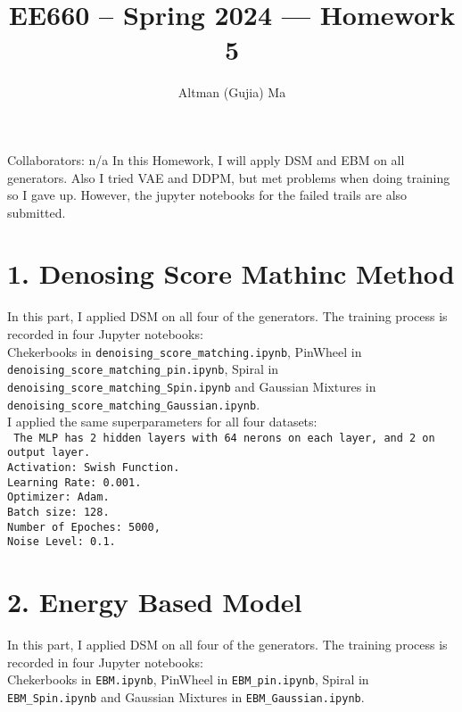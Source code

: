 \documentclass[11pt]{article}
\title{EE660 -- Spring 2024 --- Homework 5}
\author{Altman (Gujia) Ma}
\date{}
\begin{document}
	\maketitle
	
	Collaborators: n/a
	In this Homework, I will apply DSM and EBM on all generators. Also I tried VAE and DDPM, but met problems when doing training so I gave up. However, the jupyter notebooks for the failed trails are also submitted. 
	\section*{1. Denosing Score Mathinc Method}
	In this part, I applied DSM on all four of the generators. 
	The training process is recorded in four Jupyter notebooks:\\ Chekerbooks in \texttt{denoising\_score\_matching.ipynb}, PinWheel in \texttt{denoising\_score\_matching\_pin.ipynb}, Spiral in \texttt{denoising\_score\_matching\_Spin.ipynb} and Gaussian Mixtures in\\ \texttt{denoising\_score\_matching\_Gaussian.ipynb}. \\
	I applied the same superparameters for all four datasets:\\\texttt{
	The MLP has 2 hidden layers with 64 nerons on each layer, and 2 on output layer. \\
	Activation: Swish Function.\\
	Learning Rate: 0.001.\\
	Optimizer: Adam.\\
	Batch size: 128.\\
	Number of Epoches: 5000,\\
	Noise Level: 0.1.\\}
	\section*{2. Energy Based Model}
	In this part, I applied DSM on all four of the generators. 
	The training process is recorded in four Jupyter notebooks:\\ Chekerbooks in \texttt{EBM.ipynb}, PinWheel in \texttt{EBM\_pin.ipynb}, Spiral in \texttt{EBM\_Spin.ipynb} and Gaussian Mixtures in \texttt{EBM\_Gaussian.ipynb}. \\
\end{document}
